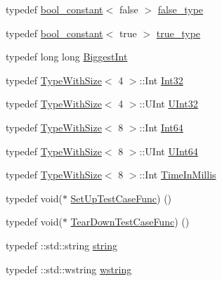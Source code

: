 \begin{DoxyCompactItemize}
\item 
typedef \mbox{\hyperlink{structtesting_1_1internal_1_1bool__constant}{bool\+\_\+constant}}$<$ false $>$ \mbox{\hyperlink{namespacetesting_1_1internal_a91e570bc966cc243d784dbb550bbbe7d}{false\+\_\+type}}
\item 
typedef \mbox{\hyperlink{structtesting_1_1internal_1_1bool__constant}{bool\+\_\+constant}}$<$ true $>$ \mbox{\hyperlink{namespacetesting_1_1internal_a0189db17b0bd7e74f149d460ea9531a5}{true\+\_\+type}}
\item 
typedef long long \mbox{\hyperlink{namespacetesting_1_1internal_a05c6bd9ede5ccdf25191a590d610dcc6}{Biggest\+Int}}
\item 
typedef \mbox{\hyperlink{classtesting_1_1internal_1_1_type_with_size}{Type\+With\+Size}}$<$ 4 $>$\+::Int \mbox{\hyperlink{namespacetesting_1_1internal_af89e21e4043b5cf0c120af487b24fa06}{Int32}}
\item 
typedef \mbox{\hyperlink{classtesting_1_1internal_1_1_type_with_size}{Type\+With\+Size}}$<$ 4 $>$\+::U\+Int \mbox{\hyperlink{namespacetesting_1_1internal_a436defbb8e92c8e94e33ebcc86f278ba}{U\+Int32}}
\item 
typedef \mbox{\hyperlink{classtesting_1_1internal_1_1_type_with_size}{Type\+With\+Size}}$<$ 8 $>$\+::Int \mbox{\hyperlink{namespacetesting_1_1internal_abd4adb4f2e2d7078a473de91a4089501}{Int64}}
\item 
typedef \mbox{\hyperlink{classtesting_1_1internal_1_1_type_with_size}{Type\+With\+Size}}$<$ 8 $>$\+::U\+Int \mbox{\hyperlink{namespacetesting_1_1internal_ad24ae0a18ae0d3758b9a8333a0b56a4b}{U\+Int64}}
\item 
typedef \mbox{\hyperlink{classtesting_1_1internal_1_1_type_with_size}{Type\+With\+Size}}$<$ 8 $>$\+::Int \mbox{\hyperlink{namespacetesting_1_1internal_a5eed833eddf9ea8ca45546c125f4ef0c}{Time\+In\+Millis}}
\item 
typedef void($\ast$ \mbox{\hyperlink{namespacetesting_1_1internal_a30037044c0b57cdd647c7e2e97cb2cff}{Set\+Up\+Test\+Case\+Func}}) ()
\item 
typedef void($\ast$ \mbox{\hyperlink{namespacetesting_1_1internal_a085e31321d0d029c04d2a79234f60c1a}{Tear\+Down\+Test\+Case\+Func}}) ()
\item 
typedef \+::std\+::string \mbox{\hyperlink{namespacetesting_1_1internal_a8e8ff5b11e64078831112677156cb111}{string}}
\item 
typedef \+::std\+::wstring \mbox{\hyperlink{namespacetesting_1_1internal_a3f543179329c353aee1d7b54a9a8e335}{wstring}}
\end{DoxyCompactItemize}

